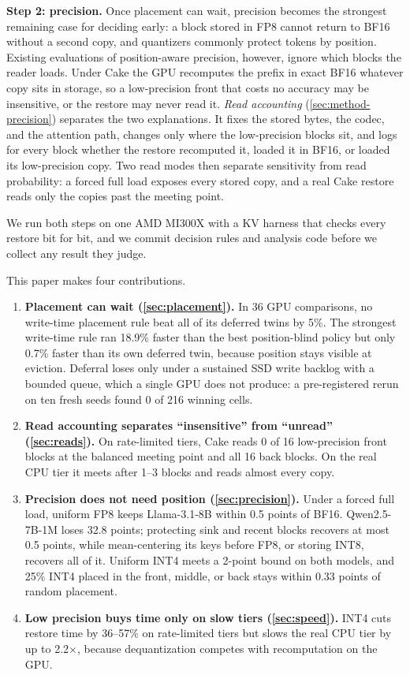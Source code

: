 \documentclass[conference]{IEEEtran}
\begin{document}
\textbf{Step 2: precision.}
Once placement can wait, precision becomes the strongest remaining case for deciding early: a block stored in FP8 cannot return to BF16 without a second copy, and quantizers commonly protect tokens by position.
Existing evaluations of position-aware precision, however, ignore which blocks the reader loads.
Under Cake the GPU recomputes the prefix in exact BF16 whatever copy sits in storage, so a low-precision front that costs no accuracy may be insensitive, or the restore may never read it.
\emph{Read accounting} (\cref{sec:method-precision}) separates the two explanations.
It fixes the stored bytes, the codec, and the attention path, changes only where the low-precision blocks sit, and logs for every block whether the restore recomputed it, loaded it in BF16, or loaded its low-precision copy.
Two read modes then separate sensitivity from read probability: a forced full load exposes every stored copy, and a real Cake restore reads only the copies past the meeting point.

We run both steps on one AMD MI300X with a KV harness that checks every restore bit for bit, and we commit decision rules and analysis code before we collect any result they judge.

This paper makes four contributions.
\begin{enumerate}
\item \textbf{Placement can wait (\cref{sec:placement}).}
In 36 GPU comparisons, no write-time placement rule beat all of its deferred twins by 5\%.
The strongest write-time rule ran 18.9\% faster than the best position-blind policy but only 0.7\% faster than its own deferred twin, because position stays visible at eviction.
Deferral loses only under a sustained SSD write backlog with a bounded queue, which a single GPU does not produce: a pre-registered rerun on ten fresh seeds found 0 of 216 winning cells.
\item \textbf{Read accounting separates ``insensitive'' from ``unread'' (\cref{sec:reads}).}
On rate-limited tiers, Cake reads 0 of 16 low-precision front blocks at the balanced meeting point and all 16 back blocks.
On the real CPU tier it meets after 1--3 blocks and reads almost every copy.
\item \textbf{Precision does not need position (\cref{sec:precision}).}
Under a forced full load, uniform FP8 keeps Llama-3.1-8B within 0.5 points of BF16.
Qwen2.5-7B-1M loses 32.8 points; protecting sink and recent blocks recovers at most 0.5 points, while mean-centering its keys before FP8, or storing INT8, recovers all of it.
Uniform INT4 meets a 2-point bound on both models, and 25\% INT4 placed in the front, middle, or back stays within 0.33 points of random placement.
\item \textbf{Low precision buys time only on slow tiers (\cref{sec:speed}).}
INT4 cuts restore time by 36--57\% on rate-limited tiers but slows the real CPU tier by up to 2.2$\times$, because dequantization competes with recomputation on the GPU.
\end{enumerate}
\end{document}
